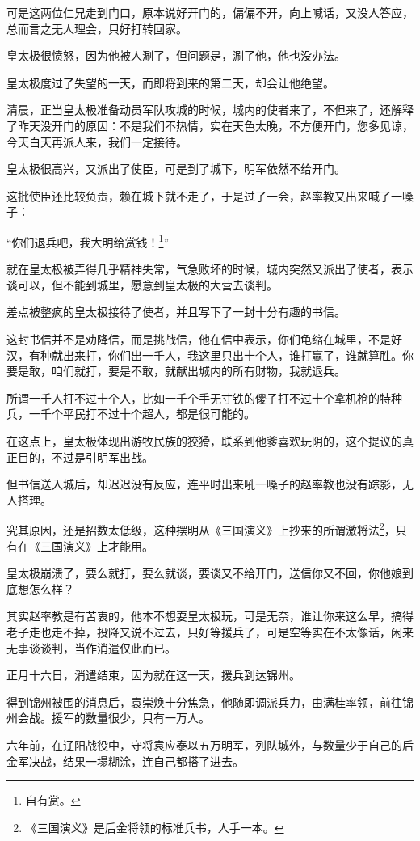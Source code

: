 \begin{multicols}{\theparacolNo}
可是这两位仁兄走到门口，原本说好开门的，偏偏不开，向上喊话，又没人答应，总而言之无人理会，只好打转回家。

皇太极很愤怒，因为他被人涮了，但问题是，涮了他，他也没办法。

皇太极度过了失望的一天，而即将到来的第二天，却会让他绝望。

清晨，正当皇太极准备动员军队攻城的时候，城内的使者来了，不但来了，还解释了昨天没开门的原因：不是我们不热情，实在天色太晚，不方便开门，您多见谅，今天白天再派人来，我们一定接待。

皇太极很高兴，又派出了使臣，可是到了城下，明军依然不给开门。

这批使臣还比较负责，赖在城下就不走了，于是过了一会，赵率教又出来喊了一嗓子：

“你们退兵吧，我大明给赏钱！\footnote{自有赏。}”

就在皇太极被弄得几乎精神失常，气急败坏的时候，城内突然又派出了使者，表示谈可以，但不能到城里，愿意到皇太极的大营去谈判。

差点被整疯的皇太极接待了使者，并且写下了一封十分有趣的书信。

这封书信并不是劝降信，而是挑战信，他在信中表示，你们龟缩在城里，不是好汉，有种就出来打，你们出一千人，我这里只出十个人，谁打赢了，谁就算胜。你要是敢，咱们就打，要是不敢，就献出城内的所有财物，我就退兵。

所谓一千人打不过十个人，比如一千个手无寸铁的傻子打不过十个拿机枪的特种兵，一千个平民打不过十个超人，都是很可能的。

在这点上，皇太极体现出游牧民族的狡猾，联系到他爹喜欢玩阴的，这个提议的真正目的，不过是引明军出战。

但书信送入城后，却迟迟没有反应，连平时出来吼一嗓子的赵率教也没有踪影，无人搭理。

究其原因，还是招数太低级，这种摆明从《三国演义》上抄来的所谓激将法\footnote{《三国演义》是后金将领的标准兵书，人手一本。}，只有在《三国演义》上才能用。

皇太极崩溃了，要么就打，要么就谈，要谈又不给开门，送信你又不回，你他娘到底想怎么样？

其实赵率教是有苦衷的，他本不想耍皇太极玩，可是无奈，谁让你来这么早，搞得老子走也走不掉，投降又说不过去，只好等援兵了，可是空等实在不太像话，闲来无事谈谈判，当作消遣仅此而已。

正月十六日，消遣结束，因为就在这一天，援兵到达锦州。

得到锦州被围的消息后，袁崇焕十分焦急，他随即调派兵力，由满桂率领，前往锦州会战。援军的数量很少，只有一万人。

六年前，在辽阳战役中，守将袁应泰以五万明军，列队城外，与数量少于自己的后金军决战，结果一塌糊涂，连自己都搭了进去。


\end{multicols}
